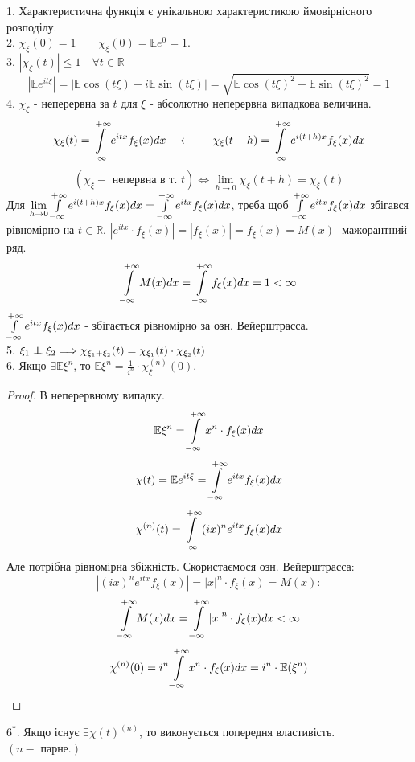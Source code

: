 1. Характеристична функція є унікальною характеристикою ймовірнісного розподілу.\\
2. $ \chi_{\xi} (0) = 1  \qquad \chi_{\xi} (0) =  \mathbb{E} e^0 = 1$.\\
3. $	\left| \chi_ \xi (t)\right| \leq 1 \quad \forall t \in \mathbb{R}$
$$
\left| \mathbb{E} e^{it \xi} \right| = \left| \mathbb{E}\cos{(t \xi)} + i \mathbb{E} \sin{(t \xi)}   \right| = \sqrt{
\mathbb{E} \cos{(t \xi)}^2 + \mathbb{E} \sin{(t \xi)}^2
}  = 1
$$
4. $\chi_ \xi$ - неперервна за $t$ для $\xi$ - абсолютно неперервна випадкова величина.
$$
\chi_ {\xi} (t) =  \int\limits_{-\infty}^{ +\infty}{ e^{itx} f_{\xi} (x) dx}
\quad \longleftarrow \quad
\chi_ {\xi} (t+h) =  \int\limits_{-\infty}^{ +\infty}{ e^{i(t+h)x} f_{\xi} (x) dx}
$$
$$
(\chi_{\xi} - \text{ непервна в т. } t ) \Longleftrightarrow  \lim\limits_{h\to0}{ \chi_ \xi (t+h) } = \chi_{\xi} (t)
$$
Для $
 \lim\limits_{h\to  0}{  \int\limits_{-\infty}^{ +\infty}{ e^{i(t+h)x} f_{\xi}(x)}dx} =  \int\limits_{-\infty}^{ +\infty}{ e^{itx} f_ \xi(x) dx}
$, треба щоб $  \int\limits_{ -\infty}^{ +\infty}{e^{itx}f_ \xi (x)dx}$ збігався рівномірно на $t \in \mathbb{R}$. $ \left| e^{itx} \cdot f_{\xi}(x) \right| = \left| f_{\xi}(x) \right| = f_{\xi}(x) = M(x) $- мажорантний ряд.\\
$$
 \int\limits_{-\infty}^{ +\infty}{ M(x) dx } =  \int\limits_{-\infty}^{ +\infty}{f_{\xi}(x)dx } = 1 < \infty
$$
$
 \int\limits_{-\infty}^{ +\infty}{ e^{itx} f_{\xi} (x) dx }
$ - збігається рівномірно за озн. Вейерштрасса.\\
5. $ \xi_1 \independent \xi_2 \Longrightarrow \chi_{\xi_1 + \xi_2} (t) = \chi_ {\xi_1} (t) \cdot  \chi_ {\xi_2} (t) $\\
6. Якщо $ \exists \mathbb{E} \xi^n$, то $\mathbb{E} \xi^n = \frac{1}{i^n}\cdot \chi^{(n)}_ \xi (0) $.
\begin{proof} В неперервному випадку.
$$
\mathbb{E} \xi^n =  \int\limits_{-\infty}^{ +\infty}{x^n \cdot f_ {\xi} (x)dx}
$$
$$
\chi (t) = \mathbb{E} e^{it \xi} =  \int\limits_{-\infty}^{ +\infty}{ e^{itx} f_ \xi(x) dx}
$$
$$
\chi^{(n)}(t) =  \int\limits_{-\infty}^{ +\infty}{ (ix)^n e^{itx} f_ \xi  (x) dx}
$$
Але потрібна рівномірна збіжність. Скористаємося озн. Вейерштрасса:
$$
\left| (ix)^n e^{itx} f_ \xi  (x)  \right| = \left| x \right|^n \cdot f_ \xi (x) = M(x):
$$
$$
 \int\limits_{-\infty}^{ +\infty}{ M(x)dx} =  \int\limits_{-\infty}^{ +\infty}{ \left| x \right|^n \cdot f_{\xi}(x)dx < \infty }
$$
$$
\chi^{(n)}(0) = i^n  \int\limits_{-\infty}^{ +\infty}{ x^n \cdot f_{\xi} (x)dx} = i^n \cdot \mathbb{E}(\xi^n)
$$

\end{proof}
$6^*. $ Якщо існує $ \exists \chi (t)^{(n)}$, то виконується попередня властивість. $(n - \text{ парне.})$\\

